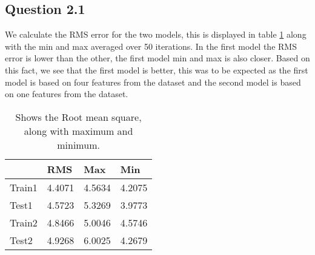 \subsection*{Question 2.1}

We calculate the RMS error for the two models, this is displayed in
table \ref{tab:q21} along with the min and max averaged over 50
iterations. In the first model the RMS error is lower than the other,
the first model min and max is also closer. Based on this fact, we see
that the first model is better, this was to be expected as the first
model is based on four features from the dataset and the second model
is based on one features from the dataset.

\begin{table}[!htbp]
  \centering
  \begin{tabular}{| l | l | l | l |}
    \hline
    {}		& RMS		& Max		& Min \\
    \hline
    Train1	& 4.4071	& 4.5634	& 4.2075 \\
    \hline
    Test1	& 4.5723	& 5.3269	& 3.9773 \\
    \hline
    Train2	& 4.8466	& 5.0046	& 4.5746 \\
    \hline
    Test2	& 4.9268	& 6.0025	& 4.2679 \\
    \hline
  \end{tabular}
  \caption{Shows the Root mean square, along with maximum and minimum.}
  \label{tab:q21}
\end{table}

\newpage
